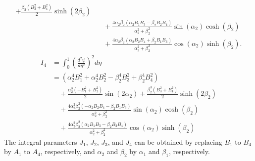 \documentclass[preprint,12pt,number]{elsarticle}
\begin{document}
\begin{appendices}
\begin{equation}
\begin{aligned}
		+ \frac{\beta_2 (B_3^2 + B_4^2)}{2} \sinh(2\beta_2) \\
		&\quad + \frac{4 \alpha_2 \beta_2 (\alpha_2 B_1 B_3 - \beta_2 B_2 B_4)}{\alpha_2^2 + \beta_2^2} \sin(\alpha_2) \cosh(\beta_2) \\
		&\quad + \frac{4 \alpha_2 \beta_2 (\alpha_2 B_2 B_4 + \beta_2 B_1 B_3)}{\alpha_2^2 + \beta_2^2} \cos(\alpha_2) \sinh(\beta_2).
	\end{aligned}
\end{equation}
%
\begin{equation}\label{eq:inte_dphi4}
	\begin{split}
		I_4 &= \int_{0}^{1} \left( \frac{d^2 \psi}{d \eta^2} \right)^2 d \eta \\
		&= \left( \alpha_2^4 B_1^2 + \alpha_2^4 B_2^2 - \beta_2^4 B_3^2 + \beta_2^4 B_4^2 \right) \\
		&\quad + \frac{\alpha_2^3 (-B_1^2 + B_2^2)}{2} \sin(2 \alpha_2)
		+ \frac{\beta_2^3 (B_3^2 + B_4^2)}{2} \sinh(2 \beta_2) \\
		&\quad + \frac{4 \alpha_2^2 \beta_2^2 (-\alpha_2 B_2 B_4 - \beta_2 B_1 B_3)}{\alpha_2^2 + \beta_2^2} \sin(\alpha_2) \cosh(\beta_2) \\
		&\quad + \frac{4 \alpha_2^2 \beta_2^2 (\alpha_2 B_1 B_3 - \beta_2 B_2 B_4)}{\alpha_2^2 + \beta_2^2} \cos(\alpha_2) \sinh(\beta_2)
	\end{split}
\end{equation}
%
The integral parameters $J_1$, $J_2$, $J_3$, and $J_4$ can be obtained by replacing $B_1$ to $B_4$ by $ A_1 $ to $A_4$, respectively, and $\alpha_2$ and $\beta_2$ by $\alpha_1$ and $\beta_1$, respectively.

\end{appendices}
\end{document}
